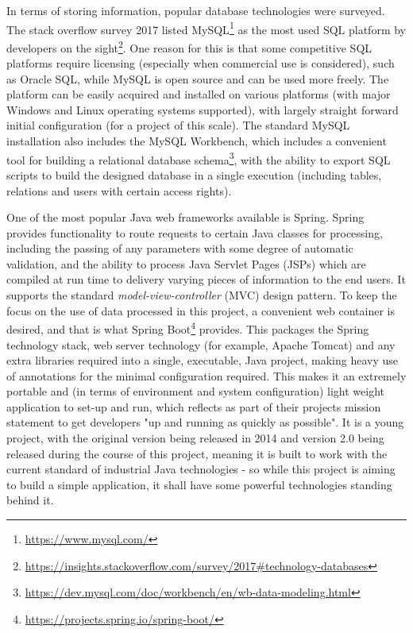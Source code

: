 In terms of storing information, popular database technologies were surveyed. The stack overflow survey 2017 listed MySQL\footnote{\href{https://www.mysql.com/}{https://www.mysql.com/}} as the most used SQL platform by developers on the sight\footnote{\href{https://insights.stackoverflow.com/survey/2017\#technology-databases}{https://insights.stackoverflow.com/survey/2017\#technology-databases}}. One reason for this is that some competitive SQL platforms require licensing (especially when commercial use is considered), such as Oracle SQL, while MySQL is open source and can be used more freely. The platform can be easily acquired and installed on various platforms (with major Windows and Linux operating systems supported), with largely straight forward initial configuration (for a project of this scale). The standard MySQL installation also includes the MySQL Workbench, which includes a convenient tool for building a relational database schema\footnote{\href{https://dev.mysql.com/doc/workbench/en/wb-data-modeling.html}{https://dev.mysql.com/doc/workbench/en/wb-data-modeling.html}}, with the ability to export SQL scripts to build the designed database in a single execution (including tables, relations and users with certain access rights). 

One of the most popular Java web frameworks available is Spring. Spring provides functionality to route requests to certain Java classes for processing, including the passing of any parameters with some degree of automatic validation, and the ability to process Java Servlet Pages (JSPs) which are compiled at run time to delivery varying pieces of information to the end users. It supports the standard \textit{model-view-controller} (MVC) design pattern. To keep the focus on the use of data processed in this project, a convenient web container is desired, and that is what Spring Boot\footnote{\href{https://projects.spring.io/spring-boot/}{https://projects.spring.io/spring-boot/}} provides. This packages the Spring technology stack, web server technology (for example, Apache Tomcat) and any extra libraries required into a single, executable, Java project, making heavy use of annotations for the minimal configuration required. This makes it an extremely portable and (in terms of environment and system configuration) light weight application to set-up and run, which reflects as part of their projects mission statement to get developers "up and running as quickly as possible". It is a young project, with the original version being released in 2014 and version 2.0 being released during the course of this project, meaning it is built to work with the current standard of industrial Java technologies - so while this project is aiming to build a simple application, it shall have some powerful technologies standing behind it.


